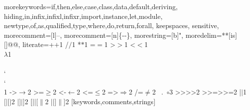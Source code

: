 \usepackage{listings}
\usepackage{lstlinebgrd}
\usepackage{etoolbox}


%
  {morekeywords={if,then,else,case,class,data,default,deriving,%
      hiding,in,infix,infixl,infixr,import,instance,let,module,%
      newtype,of,as,qualified,type,where,do,return,forall},%
   keepspaces,%
   sensitive,%
   morecomment=[l]--,%
   morecomment=[n]{\{-}{-\}},%
   morestring=[b]",%
  moredelim=**[is][\color{TemplateStage}]{@}{@},
   literate={+}{{$+$}}1 {/}{{$/$}}1 {*}{{$*$}}1 {=}{{$=$}}1
            {>}{{$>$}}1 {<}{{$<$}}1 {\\}{{$\lambda$}}1
            {\\\\}{{\char`\\\char`\\}}1
            {->}{{$\rightarrow$}}2 {>=}{{$\geq$}}2 {<-}{{$\leftarrow$}}2
            {<=}{{$\leq$}}2 {=>}{{$\Rightarrow$}}2 
            {/=}{{$\ne$}}2
            {\ .\ }{{$\circ$}}3
            {>>}{{>>}}2 {>>=}{{>>=}}2
            {|}{{$\mid$}}1
            {[|}{{[$|$}}2
            {|]}{{$|$]}}2
            {[||}{{[$\|$}}2
            {||]}{{$\|$]}}2
  }[keywords,comments,strings]%
\lstset{language=Haskell}


